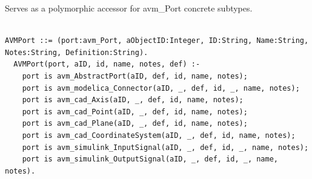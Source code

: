 Serves as a polymorphic accessor for avm\_Port concrete subtypes.
\begin{lstlisting}

AVMPort ::= (port:avm_Port, aObjectID:Integer, ID:String, Name:String, Notes:String, Definition:String).
  AVMPort(port, aID, id, name, notes, def) :-
    port is avm_AbstractPort(aID, def, id, name, notes);
    port is avm_modelica_Connector(aID, _, def, id, _, name, notes);
    port is avm_cad_Axis(aID, _, def, id, name, notes);
    port is avm_cad_Point(aID, _, def, id, name, notes);
    port is avm_cad_Plane(aID, _, def, id, name, notes);
    port is avm_cad_CoordinateSystem(aID, _, def, id, name, notes);
    port is avm_simulink_InputSignal(aID, _, def, id, _, name, notes);
    port is avm_simulink_OutputSignal(aID, _, def, id, _, name, notes).


\end{lstlisting}

